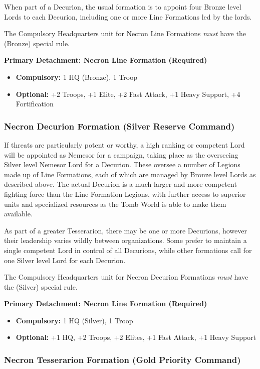 When part of a Decurion, the usual formation is to appoint four Bronze level Lords to each Decurion, including one or more Line Formations led by the lords.

The Compulsory Headquarters unit for Necron Line Formations \textit{must} have the  (Bronze) special rule.

\textbf{Primary Detachment: Necron Line Formation (Required)}
\begin{itemize}
	\item \textbf{Compulsory:} 1 HQ (Bronze),  1 Troop
	\item \textbf{Optional:} +2 Troops, +1 Elite, +2 Fast Attack, +1 Heavy Support, +4 Fortification
\end{itemize}

\subsubsection{Necron Decurion Formation (Silver Reserve Command)}

If threats are particularly potent or worthy, a high ranking or competent Lord will be appointed as Nemesor for a campaign, taking place as the overseeing Silver level Nemesor Lord for a Decurion. These oversee a number of Legions made up of Line Formations, each of which are managed by Bronze level Lords as described above. The actual Decurion is a much larger and more competent fighting force than the Line Formation Legions, with further access to superior units and specialized resources as the Tomb World is able to make them available.

As part of a greater Tesserarion, there may be one or more Decurions, however their leadership varies wildly between organizations. Some prefer to maintain a single competent Lord in control of all Decurions, while other formations call for one Silver level Lord for each Decurion.

The Compulsory Headquarters unit for Necron Decurion Formations \textit{must} have the  (Silver) special rule.

\textbf{Primary Detachment: Necron Line Formation (Required)}
\begin{itemize}
	\item \textbf{Compulsory:} 1 HQ (Silver),  1 Troop
	\item \textbf{Optional:} +1 HQ, +2 Troops, +2 Elites, +1 Fast Attack, +1 Heavy Support
\end{itemize}

\subsubsection{Necron Tesserarion Formation (Gold Priority Command)}

